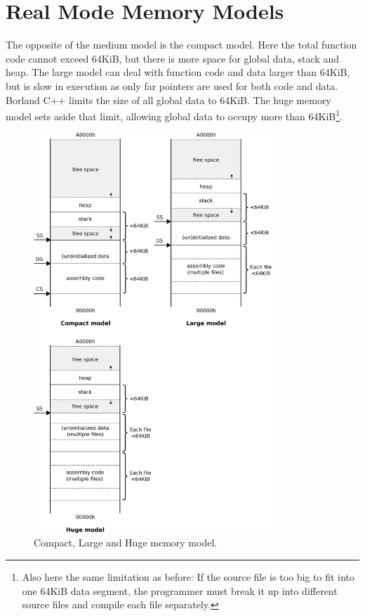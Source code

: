 \documentclass[book.tex]{subfiles}
\begin{document}
\chapter{Real Mode Memory Models}
\label{appendix_memory_models}

The opposite of the medium model is the compact model. Here the total function code cannot exceed 64KiB, but there is more space for global data, stack and heap. The large model can deal with function code and data larger than 64KiB, but is slow in execution as only far pointers are used for both code and data. Borland C++ limits the size of all global data to 64KiB. The huge memory model sets aside that limit, allowing global data to occupy more than 64KiB\footnote{Also here the same limitation as before: If the source file is too big to fit into one 64KiB data segment, the programmer must break it up into different source files and compile each file separately.}.\\

\begin{figure}[H]
\centering
\includegraphics[width=0.8\textwidth]{imgs/drawings/memory/compact_large_huge_mm.eps}
\caption{Compact, Large and Huge memory model.}
\label{fig:mm_huge}
\end{figure}
\par

\end{document}
